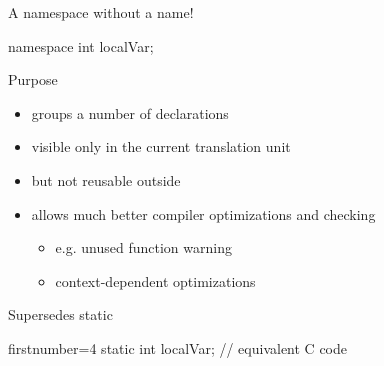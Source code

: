 \begin{advanced}
\begin{frame}[fragile]
  \begin{exampleblock}{A namespace without a name!}
    \begin{cppcode*}{}
      namespace {
        int localVar;
      }
    \end{cppcode*}
  \end{exampleblock}
  \begin{block}{Purpose}
    \begin{itemize}
    \item groups a number of declarations
    \item visible only in the current translation unit
    \item but not reusable outside
    \item allows much better compiler optimizations and checking
      \begin{itemize}
      \item e.g. unused function warning
      \item context-dependent optimizations
      \end{itemize}
    \end{itemize}
  \end{block}
  \begin{alertblock}{Supersedes static}
    \begin{cppcode*}{firstnumber=4}
      static int localVar; // equivalent C code
    \end{cppcode*}
  \end{alertblock}
\end{frame}


\end{advanced}
